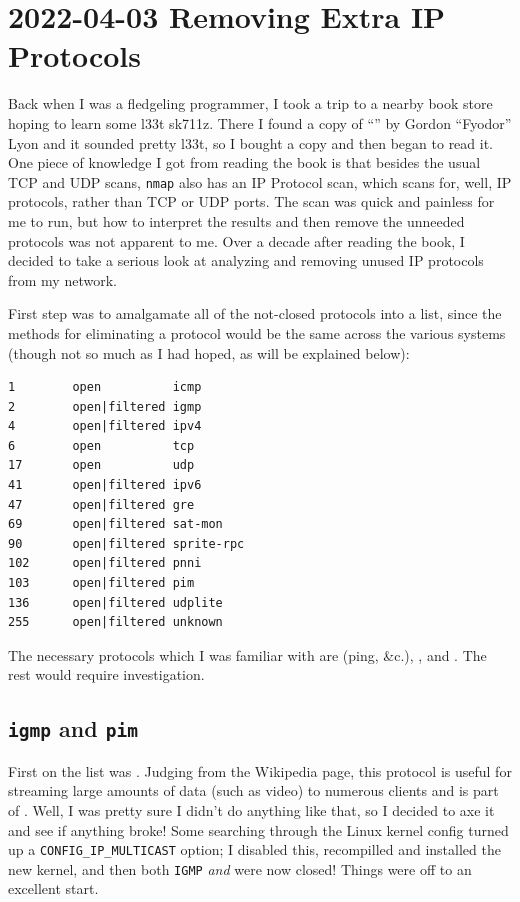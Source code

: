 \documentclass{article}
\begin{document}
\section{2022-04-03 Removing Extra IP Protocols}
Back when I was a fledgeling programmer, I took a trip to a nearby book store hoping to learn some l33t sk711z.  There I found a copy of ``'' by Gordon ``Fyodor'' Lyon and it sounded pretty l33t, so I bought a copy and then began to read it.  One piece of knowledge I got from reading the book is that besides the usual TCP and UDP scans, \texttt{nmap} also has an IP Protocol scan, which scans for, well, IP protocols, rather than TCP or UDP ports.  The scan was quick and painless for me to run, but how to interpret the results and then remove the unneeded protocols was not apparent to me.  Over a decade after reading the book, I decided to take a serious look at analyzing and removing unused IP protocols from my network.

First step was to amalgamate all of the not-closed protocols into a list, since the methods for eliminating a protocol would be the same across the various systems (though not so much as I had hoped, as will be explained below):

\begin{verbatim}
1        open          icmp
2        open|filtered igmp
4        open|filtered ipv4
6        open          tcp
17       open          udp
41       open|filtered ipv6
47       open|filtered gre
69       open|filtered sat-mon
90       open|filtered sprite-rpc
102      open|filtered pnni
103      open|filtered pim
136      open|filtered udplite
255      open|filtered unknown
\end{verbatim}

The necessary protocols which I was familiar with are  (ping, \&c.), , and .  The rest would require investigation.

\subsection{\texttt{igmp} and \texttt{pim}}
First on the list was .  Judging from the Wikipedia page, this protocol is useful for streaming large amounts of data (such as video) to numerous clients and is part of .  Well, I was pretty sure I didn't do anything like that, so I decided to axe it and see if anything broke!  Some searching through the Linux kernel config turned up a \texttt{CONFIG_IP_MULTICAST} option; I disabled this, recompilled and installed the new kernel, and then both \texttt{IGMP} \emph{and}  were now closed!  Things were off to an excellent start.
\end{document}
